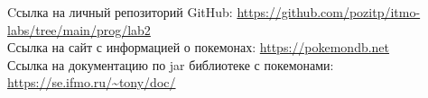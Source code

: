 \begin{thebibliography}{}
     Cсылка на личный репозиторий GitHub: \url{https://github.com/pozitp/itmo-labs/tree/main/prog/lab2}\\
     Ссылка на сайт с информацией о покемонах: \url{https://pokemondb.net}\\
     Ссылка на документацию по jar библиотеке с покемонами: \url{https://se.ifmo.ru/~tony/doc/}\\
\end{thebibliography}